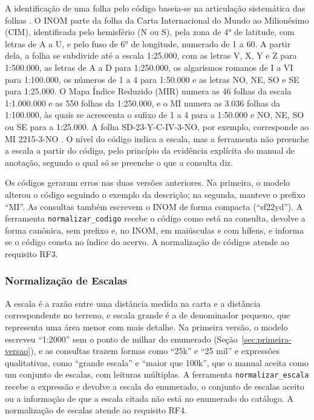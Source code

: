 A identificação de uma folha pelo código baseia-se na articulação sistemática das folhas \cite{ibge1999nocoes}. O INOM parte da folha da Carta Internacional do Mundo ao Milionésimo (CIM), identificada pelo hemisfério (N ou S), pela zona de 4° de latitude, com letras de A a U, e pelo fuso de 6° de longitude, numerado de 1 a 60. A partir dela, a folha se subdivide até a escala 1:25.000, com as letras V, X, Y e Z para 1:500.000, as letras de A a D para 1:250.000, os algarismos romanos de I a VI para 1:100.000, os números de 1 a 4 para 1:50.000 e as letras NO, NE, SO e SE para 1:25.000. O Mapa Índice Reduzido (MIR) numera as 46 folhas da escala 1:1.000.000 e as 550 folhas da 1:250.000, e o MI numera as 3.036 folhas da 1:100.000, às quais se acrescenta o sufixo de 1 a 4 para a 1:50.000 e NO, NE, SO ou SE para a 1:25.000. A folha SD-23-Y-C-IV-3-NO, por exemplo, corresponde ao MI 2215-3-NO \cite{ibge1999nocoes}. O nível do código indica a escala, mas a ferramenta não preenche a escala a partir do código, pelo princípio da evidência explícita do manual de anotação, segundo o qual só se preenche o que a consulta diz.

Os códigos geraram erros nas duas versões anteriores. Na primeira, o modelo alterou o código seguindo o exemplo da descrição; na segunda, manteve o prefixo ``MI''. As consultas também escrevem o INOM de forma compacta (``sf22yd''). A ferramenta \texttt{normalizar\_codigo} recebe o código como está na consulta, devolve a forma canônica, sem prefixo e, no INOM, em maiúsculas e com hífens, e informa se o código consta no índice do acervo. A normalização de códigos atende ao requisito RF3.

\subsubsection{Normalização de Escalas}
\label{sec:normalizar-escala}

A escala é a razão entre uma distância medida na carta e a distância correspondente no terreno, e escala grande é a de denominador pequeno, que representa uma área menor com mais detalhe. Na primeira versão, o modelo escreveu ``1:2000'' sem o ponto de milhar do enumerado (Seção~\ref{sec:primeira-versao}), e as consultas trazem formas como ``25k'' e ``25 mil'' e expressões qualitativas, como ``grande escala'' e ``maior que 100k'', que o manual aceita como um conjunto de escalas, com leituras múltiplas. A ferramenta \texttt{normalizar\_escala} recebe a expressão e devolve a escala do enumerado, o conjunto de escalas aceito ou a informação de que a escala citada não está no enumerado do catálogo. A normalização de escalas atende ao requisito RF4.

